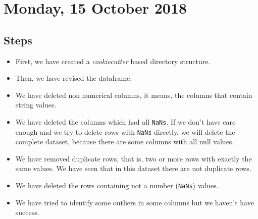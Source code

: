 \section{Monday, 15 October 2018}

\subsection{Steps}
\begin{itemize}
\item First, we have created a \textit{cookiecutter} based directory structure. 

\item Then, we have revised the dataframe.

\item We have deleted non numerical columns, it means, the columns that contain string values.

\item We have deleted the columns which had all \texttt{NaNs}. If we don't have care enough and we try to delete rows with \texttt{NaNs} directly, we will delete the complete dataset, because there are some columns with all null values.

\item We have removed duplicate rows, that is, two or more rows with exactly the same values. We have seen that in this dataset there are not duplicate rows. 

\item We have deleted the rows containing not a number (\texttt{NaNs}) values.

\item We have tried to identify some outliers in some columns but we haven't have success.
\end{itemize}
